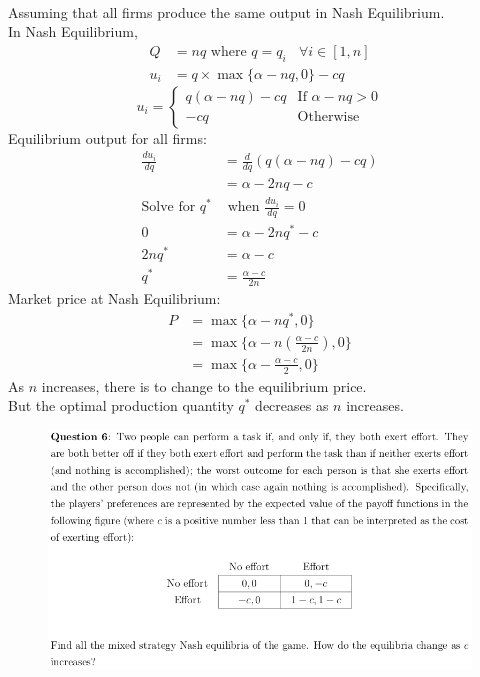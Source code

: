 \documentclass[12pt]{article}
\newenvironment{solution}[2][Solution]{\begin{trivlist}
\item[\hskip \labelsep {\bfseries #1}]}{\end{trivlist}}
\begin{document}
\begin{solution}{}~\\
Assuming that all firms produce the same output in Nash Equilibrium.\\
In Nash Equilibrium,\\
\begin{align*}
Q&=nq\text{ where }q=q_i\ \ \ \ \forall i\in[1,n]\\
u_i&=q\times\max\{\alpha-nq,0\}-cq
\end{align*}
$$u_i=\left\{\begin{array}{ll}
q(\alpha-nq)-cq & \text{If }\alpha-nq>0\\
-cq & \text{Otherwise}
\end{array}\right.$$
Equilibrium output for all firms:\\

\begin{align*}
\frac{du_i}{dq}&=\frac{d}{dq}(q(\alpha-nq)-cq)\\
&=\alpha-2nq-c\\
\text{Solve for }q^*&\text{ when }\frac{du_i}{dq}=0\\
0&=\alpha-2nq^*-c\\
2nq^*&=\alpha-c\\
q^*&=\frac{\alpha-c}{2n}
\end{align*}
Market price at Nash Equilibrium:\\

\begin{align*}
P&=\max\{\alpha-nq^*,0\}\\
&=\max\{\alpha-n(\frac{\alpha-c}{2n}),0\}\\
&=\max\{\alpha-\frac{\alpha-c}{2},0\}
\end{align*}
As $n$ increases, there is to change to the equilibrium price.\\
But the optimal production quantity $q^*$ decreases as $n$ increases.
\end{solution}

\pagebreak

\begin{figure}[h!]
\includegraphics[width=\linewidth]{./assets/201805201652.png}
\end{figure}
\end{document}

